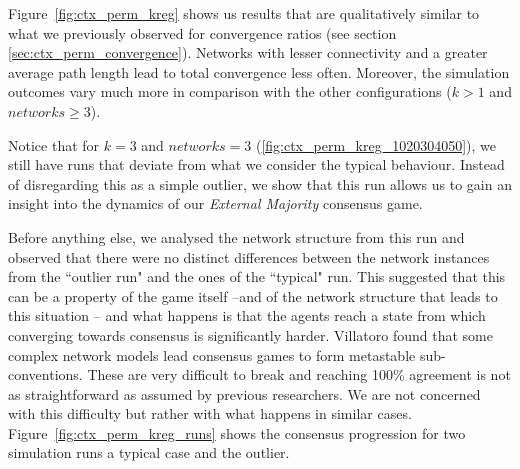 \documentclass[preprint,number]{elsarticle}
\begin{document}
\noindent Figure~\ref{fig:ctx_perm_kreg} shows us results that are qualitatively similar to what we previously observed for convergence ratios (see section \ref{sec:ctx_perm_convergence}). Networks with lesser connectivity and a greater average path length lead to total convergence less often. Moreover, the simulation outcomes vary much more in comparison with the other configurations ($k>1$ and $networks \ge 3$).

Notice that for $k=3$ and $networks=3$ (\ref{fig:ctx_perm_kreg_1020304050}), we still have runs that deviate from what we consider the typical behaviour. Instead of disregarding this as a simple outlier, we show that this run allows us to gain an insight into the dynamics of our \textit{External Majority} consensus game.

Before anything else, we analysed the network structure from this run and observed that there were no distinct differences between the network instances from the ``outlier run" and the ones of the ``typical" run. This suggested that this can be a property of the game itself --and of the network structure that leads to this situation -- and what happens is that the agents reach a state from which converging towards consensus is significantly harder. Villatoro \cite{Villatoro2013}  found that some complex network models lead consensus games to form metastable sub-conventions. These are very difficult to break and reaching 100\% agreement is not as straightforward as assumed by previous researchers. We are not concerned with this difficulty but rather with what happens in similar cases. Figure~\ref{fig:ctx_perm_kreg_runs} shows the consensus progression for two simulation runs a typical case and the outlier.
\end{document}
